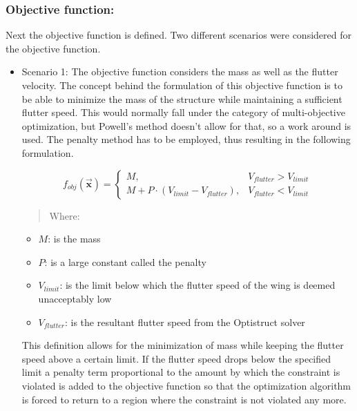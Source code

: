 \subsubsection{Objective function:}

Next the objective function is defined. Two different scenarios were
considered for the objective function.

\begin{itemize}
\item
  Scenario 1: The objective function considers the mass as well as the
  flutter velocity. The concept behind the formulation of this objective
  function is to be able to minimize the mass of the structure while
  maintaining a sufficient flutter speed. This would normally fall under
  the category of multi-objective optimization, but Powell's method
  doesn't allow for that, so a work around is used. The penalty method
  has to be employed, thus resulting in the following formulation.

\begin{equation}
    f_{obj}\left( \vec{\mathbf{x}} \right) =
    \begin{cases} 
        M, & V_{flutter} > V_{limit} \\
        M + P \cdot \left( V_{limit} - V_{flutter} \right), & V_{flutter} < V_{limit}
    \end{cases}
    \label{eq:objpowell1}
\end{equation}

\begin{quote}
Where:
\end{quote}

\begin{itemize}
\item
  \(M\): is the mass
\item
  \(P\): is a large constant called the penalty
\item
  \(V_{limit}\): is the limit below which the flutter speed of the wing
  is deemed unacceptably low
\item
  \(V_{flutter}\): is the resultant flutter speed from the Optistruct
  solver
\end{itemize}



This definition allows for the minimization of mass while keeping the flutter speed above a certain limit. If the flutter speed drops below the specified limit a penalty term proportional to the amount by which the constraint is violated is added to the objective function so that the optimization algorithm is forced to return to a region where the
constraint is not violated any more.



\end{itemize}
